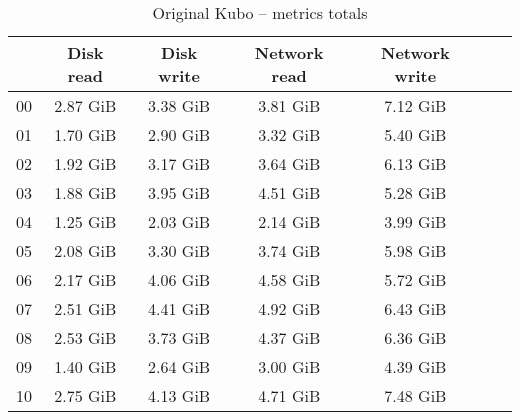\begin{table}[H]
\begin{center}
\caption{Original Kubo -- metrics totals}
\label{tab:original-total}
\begin{tabular}{|c|c|c|c|c|c|c|}
\hline
   & Disk read & Disk write & Network read & Network write\\
\hline
00 & 2.87 GiB & 3.38 GiB & 3.81 GiB & 7.12 GiB\\
01 & 1.70 GiB & 2.90 GiB & 3.32 GiB & 5.40 GiB\\
02 & 1.92 GiB & 3.17 GiB & 3.64 GiB & 6.13 GiB\\
03 & 1.88 GiB & 3.95 GiB & 4.51 GiB & 5.28 GiB\\
04 & 1.25 GiB & 2.03 GiB & 2.14 GiB & 3.99 GiB\\
05 & 2.08 GiB & 3.30 GiB & 3.74 GiB & 5.98 GiB\\
06 & 2.17 GiB & 4.06 GiB & 4.58 GiB & 5.72 GiB\\
07 & 2.51 GiB & 4.41 GiB & 4.92 GiB & 6.43 GiB\\
08 & 2.53 GiB & 3.73 GiB & 4.37 GiB & 6.36 GiB\\
09 & 1.40 GiB & 2.64 GiB & 3.00 GiB & 4.39 GiB\\
10 & 2.75 GiB & 4.13 GiB & 4.71 GiB & 7.48 GiB\\
\hline
\end{tabular}
\end{center}
\end{table}
